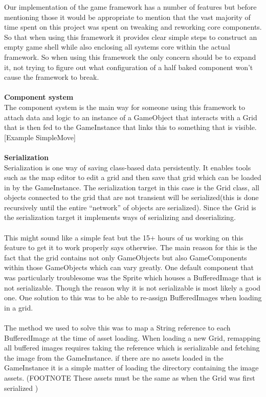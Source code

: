 \documentclass[main.tex]{subfiles}
\begin{document}
Our implementation of the game framework has a number of features but before mentioning those it would be appropriate to mention that the vast majority of time spent on this project was spent on tweaking and reworking core components. So that when using this framework it provides clear simple steps to construct an empty game shell while also enclosing all systems core within the actual framework. So when using this framework the only concern should be to expand it, not trying to figure out what configuration of a half baked component won’t cause the framework to break.
\\ \\
\textbf{Component system} \\%
The component system is the main way for someone using this framework to attach data and logic to an instance of a GameObject that interacts with a Grid that is then fed to the GameInstance that links this to something that is visible.
[Example SimpleMove]
\\ \\
\textbf{Serialization} \\%
Serialization is one way of saving class-based data persistently.  It enables tools such as the map editor to edit a grid and then save that grid which can be loaded in by the GameInstance. The serialization target in this case is the Grid class, all objects connected to the grid that are not transient will be serialized(this is done recursively until the entire “network”  of objects are serialized). Since the Grid is the serialization target it  implements ways of serializing and deserializing. 
\\ \\
This might sound like a simple feat but the 15+ hours of us working on this feature to get it to work properly says otherwise. The main reason for this is the fact that the grid contains not only GameObjects but also GameComponents within those GameObjects which can vary greatly. One default component that was particularly troublesome was the Sprite which houses a BufferedImage that is not serializable. Though the reason why it is not serializable is most likely a good one. One solution to this was to be able to re-assign BufferedImages when loading in a grid. 
\\ \\
The method we used to solve this was to map a String reference to each BufferedImage at the time of asset loading. When loading a new Grid, remapping all buffered images requires taking the reference which is serializable and fetching the image from the GameInstance. if there are no assets loaded in the GameInstance it is a simple matter of loading the directory containing the image assets. (FOOTNOTE These assets must be the same as when the Grid was first serialized )
\end{document}
